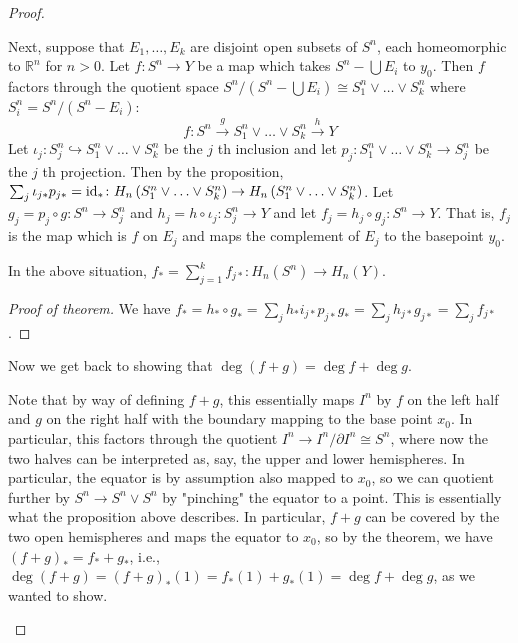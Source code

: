 \begin{proof}
\begin{enumerate}
        Next, suppose that $E_1, \ldots, E_k$ are
        disjoint open subsets of $S^{n}$, each homeomorphic to
        $\mathbb{R}^{n}$ for $n>0$.
        Let $f \colon S^{n} \to Y$ be a map which takes
        $S^{n} - \bigcup E_i $ to $y_0$. Then
        $f$ factors through the quotient space
        $S^{n} / \left( S^{n} - \bigcup E_i  \right) 
        \cong S_1^{n} \vee \ldots \vee S_k^{n}$ where
        $S_i^{n} = S^{n} / \left( S^{n} - E_i \right) $:
        \[
            f \colon S^{n} \stackrel{g}{\to }
            S_1^{n} \vee \ldots \vee S_k^{n}
            \stackrel{h}{\to } Y
        \] 
        Let $\iota_{j} \colon S_j^{n} 
        \hookrightarrow S_1^{n} \vee \ldots \vee
        S_k^{n}$ be the $j$ th inclusion and let
        $p_j \colon S_1^{n} \vee \ldots \vee
        S_k^{n} \to S_j^{n}$ be the $j$ th projection.
        Then by the proposition,
        $\sum_j \iota_{j*} p_{j*} = {\mathrm{id}}_* \colon
        H_n \left( S_1^{n} \vee \ldots \vee S_k^{n} \right) 
        \to H_n \left( S_1^{n} \vee \ldots \vee
        S_k^{n}\right) $. Let
        $g_j = p_j \circ g \colon S^{n} \to S_j^{n}$ and
        $h_j = h \circ \iota_j \colon
        S_j^{n} \to Y$ and let
        $f_j = h_j \circ g_j \colon  S^{n} \to Y$.
        That is, $f_j$ is the map which is $f$ on
        $E_j$ and maps the complement of $E_j$ to the basepoint
        $y_0$.

        \begin{theorem}[]\label{Thm:Degree-of-sum-of-maps}
            In the above situation, $f_*
            = \sum_{j=1}^{k} f_{j*} \colon
            H_n\left( S^{n} \right) \to H_n(Y)$.
        \end{theorem}

        \begin{proof}[Proof of theorem]
            We have
            $f_* = 
            h_* \circ g_* = 
            \sum_j h_* i_{j*} p_{j*} g_*
            = \sum_j h_{j*} g_{j*}
            = \sum_j f_{j*}$.
        \end{proof}

        Now we get back to showing that
        $\deg \left( f+g \right) = \deg f + \deg g$.

        Note that by way of defining
        $f+g$, this essentially maps $I^{n}$ by
        $f$ on the left half and $g$ on the right half with
        the boundary mapping to the base point $x_0$.
        In particular, this factors through the
        quotient $I^{n} \to I^{n} / \partial I^{n} 
        \cong S^{n}$, where now the two halves can be interpreted
        as, say, the upper and lower hemispheres. In particular,
        the equator is by assumption also mapped to
        $x_0$, so we can quotient further by
        $S^{n} \to S^{n} \vee S^{n}$ by "pinching" the equator
        to a point. This is essentially what the proposition
        above describes. In particular, $f+g$ can be covered
        by the two open hemispheres and maps the equator
        to $x_0$, so by the theorem,
        we have $\left( f+g \right)_*
        = f_* + g_*$, i.e.,
        $\deg (f+g) = \left( f+g \right)_*(1)
        = f_*(1) + g_*(1) = \deg f + \deg g$, as we wanted
        to show.


\end{enumerate}
\end{proof}
